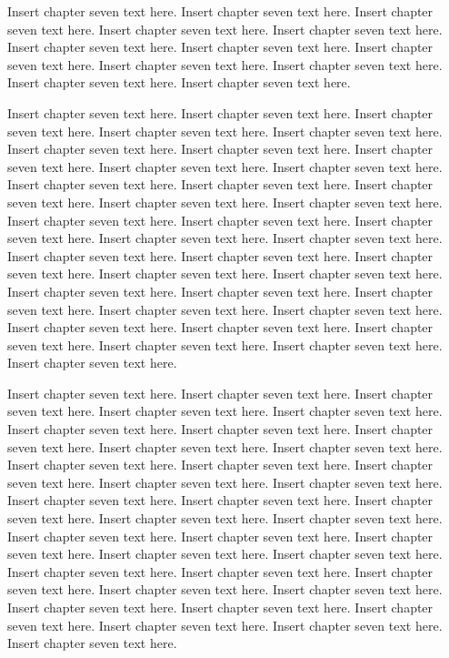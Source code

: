 Insert chapter seven text here. Insert chapter seven text here. Insert chapter seven text here. Insert chapter seven text here. Insert chapter seven text here. Insert chapter seven text here. Insert chapter seven text here. Insert chapter seven text here. Insert chapter seven text here. Insert chapter seven text here. Insert chapter seven text here. Insert chapter seven text here.

Insert chapter seven text here. Insert chapter seven text here. Insert chapter seven text here. Insert chapter seven text here. Insert chapter seven text here. Insert chapter seven text here. Insert chapter seven text here. Insert chapter seven text here. Insert chapter seven text here. Insert chapter seven text here. Insert chapter seven text here. Insert chapter seven text here. Insert chapter seven text here. Insert chapter seven text here. Insert chapter seven text here. Insert chapter seven text here. Insert chapter seven text here. Insert chapter seven text here. Insert chapter seven text here. Insert chapter seven text here. Insert chapter seven text here. Insert chapter seven text here. Insert chapter seven text here. Insert chapter seven text here. Insert chapter seven text here. Insert chapter seven text here. Insert chapter seven text here. Insert chapter seven text here. Insert chapter seven text here. Insert chapter seven text here. Insert chapter seven text here. Insert chapter seven text here. Insert chapter seven text here. Insert chapter seven text here. Insert chapter seven text here. Insert chapter seven text here.

Insert chapter seven text here. Insert chapter seven text here. Insert chapter seven text here. Insert chapter seven text here. Insert chapter seven text here. Insert chapter seven text here. Insert chapter seven text here. Insert chapter seven text here. Insert chapter seven text here. Insert chapter seven text here. Insert chapter seven text here. Insert chapter seven text here. Insert chapter seven text here. Insert chapter seven text here. Insert chapter seven text here. Insert chapter seven text here. Insert chapter seven text here. Insert chapter seven text here. Insert chapter seven text here. Insert chapter seven text here. Insert chapter seven text here. Insert chapter seven text here. Insert chapter seven text here. Insert chapter seven text here. Insert chapter seven text here. Insert chapter seven text here. Insert chapter seven text here. Insert chapter seven text here. Insert chapter seven text here. Insert chapter seven text here. Insert chapter seven text here. Insert chapter seven text here. Insert chapter seven text here. Insert chapter seven text here. Insert chapter seven text here. Insert chapter seven text here.

